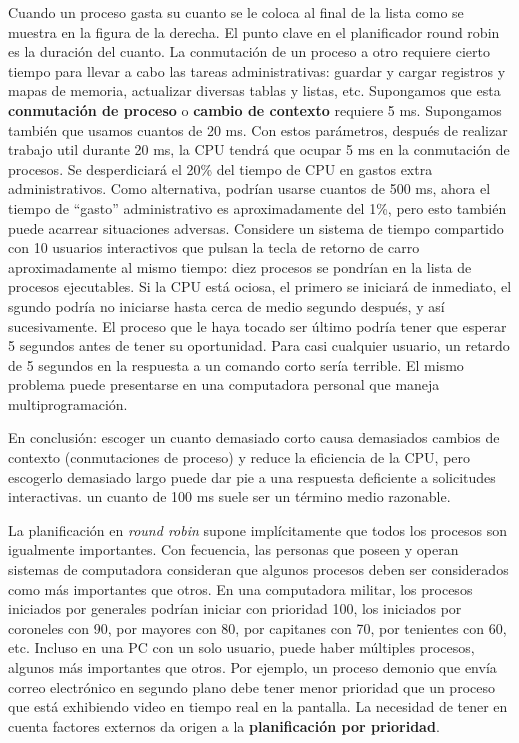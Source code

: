 \documentclass{article}
\begin{document}
Cuando un proceso gasta su cuanto se le coloca al f\/inal de la lista como se muestra 
en la f\/igura de la derecha. El punto clave en el planif\/icador round robin es la 
duraci\'on del cuanto. La conmutaci\'on de un proceso a otro requiere cierto tiempo 
para llevar a cabo las tareas administrativas: guardar y cargar registros y mapas de 
memoria, actualizar diversas tablas y listas, etc. Su\-pon\-ga\-mos que esta 
{\bf conmutaci\'on de proceso} o {\bf cambio de contexto} requiere 5 ms. Supongamos 
tambi\'en que usamos cuantos de 20 ms. Con estos par\'ametros, despu\'es de realizar 
trabajo util durante 20 ms, la CPU tendr\'a que ocupar 5 ms en la conmutaci\'on de 
procesos. Se desperdiciar\'a el 20\% del tiempo de CPU en gastos extra administrativos. 
Como alternativa, podr\'ian usarse cuantos de 500 ms, ahora el tiempo de ``gasto'' 
administrativo es aproximadamente del 1\%, pero esto tambi\'en puede acarrear 
situaciones adversas. Considere un sistema de tiempo compartido con 10 usuarios 
interactivos que pulsan la tecla de retorno de carro aproximadamente al mismo tiempo: 
diez procesos se pondr\'ian en la lista de procesos ejecutables. Si la CPU est\'a ociosa, 
el primero se iniciar\'a de inmediato, el sgundo podr\'ia no iniciarse hasta cerca de 
medio segundo despu\'es, y as\'i sucesivamente. El proceso que le haya tocado ser 
\'ultimo podr\'ia tener que esperar 5 segundos antes de tener su oportunidad. Para 
casi cualquier usuario, un retardo de 5 segundos en la respuesta a un comando corto 
ser\'ia terrible. El mismo problema puede presentarse en una computadora personal 
que maneja multiprogramaci\'on.

En conclusi\'on: escoger un cuanto demasiado corto causa demasiados cambios de 
contexto (conmutaciones de proceso) y reduce la ef\/iciencia de la CPU, pero escogerlo 
demasiado largo puede dar pie a una respuesta def\/iciente a solicitudes interactivas. 
un cuanto de 100 ms suele ser un t\'ermino medio razonable.

La planif\/icaci\'on en {\it round robin} supone impl\'icitamente que todos los 
procesos son igualmente importantes. Con fecuencia, las personas que poseen y operan 
sistemas de computadora consideran que algunos procesos deben ser considerados 
como m\'as importantes que otros. En una computadora militar, los procesos iniciados 
por generales podr\'ian iniciar con prioridad 100, los iniciados por coroneles con 90, 
por mayores con 80, por capitanes con 70, por tenientes con 60, etc.  Incluso en una 
PC con un solo usuario, puede haber m\'ultiples procesos, algunos m\'as importantes 
que otros. Por ejemplo, un proceso demonio que env\'ia correo electr\'onico en segundo 
plano debe tener menor prioridad que un proceso que est\'a exhibiendo video en tiempo 
real en la pantalla. La necesidad de tener en cuenta factores externos da origen a la 
{\bf planif\/icaci\'on por prioridad}. 
\end{document}
